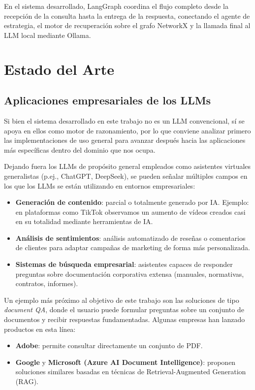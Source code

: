 En el sistema desarrollado, LangGraph coordina el flujo completo desde la recepción de la consulta hasta la entrega de la respuesta, conectando el agente de estrategia, el motor de recuperación sobre el grafo NetworkX y la llamada final al LLM local mediante Ollama.

\newpage
\chapter{Estado del Arte}\label{cap2}

\section{Aplicaciones empresariales de los LLMs}
Si bien el sistema desarrollado en este trabajo no es un LLM convencional, sí se apoya en ellos como motor de razonamiento, por lo que conviene analizar primero las implementaciones de uso general para avanzar después hacia las aplicaciones más específicas dentro del dominio que nos ocupa.

Dejando fuera los LLMs de propósito general empleados como asistentes virtuales generalistas (p.ej., ChatGPT, DeepSeek), se pueden señalar múltiples campos en los que los LLMs se están utilizando en entornos empresariales:

\begin{itemize}
    \item \textbf{Generación de contenido}: parcial o totalmente generado por IA. Ejemplo: en plataformas como TikTok observamos un aumento de vídeos creados casi en su totalidad mediante herramientas de IA.
    \item \textbf{Análisis de sentimientos}: análisis automatizado de reseñas o comentarios de clientes para adaptar campañas de marketing de forma más personalizada.
    \item \textbf{Sistemas de búsqueda empresarial}: asistentes capaces de responder preguntas sobre documentación corporativa extensa (manuales, normativas, contratos, informes).
\end{itemize}

Un ejemplo más próximo al objetivo de este trabajo son las soluciones de tipo \textit{document QA}, donde el usuario puede formular preguntas sobre un conjunto de documentos y recibir respuestas fundamentadas. Algunas empresas han lanzado productos en esta línea:
\begin{itemize}
    \item \textbf{Adobe}: permite consultar directamente un conjunto de PDF.
    \item \textbf{Google} y \textbf{Microsoft (Azure AI Document Intelligence)}: proponen soluciones similares basadas en técnicas de Retrieval-Augmented Generation (RAG).
\end{itemize}

